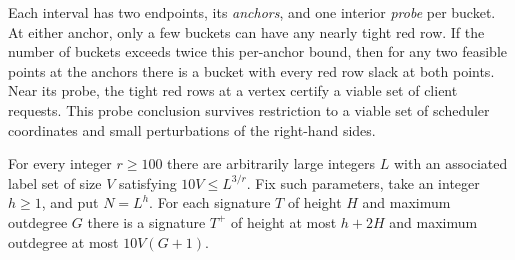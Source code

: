 Each interval has two endpoints, its \emph{anchors}, and one interior
\emph{probe} per bucket. At either anchor, only a few buckets can have any
nearly tight red row. If the number of buckets exceeds twice this
per-anchor bound, then for any two feasible points at the anchors there
is a bucket with every red row slack at both points. Near its probe, the
tight red rows at a vertex certify a viable set of client requests. This
probe conclusion survives restriction to a viable set of scheduler
coordinates and small perturbations of the right-hand sides.

\begin{theorem}[Scheduler]\label{thm:scheduler}
For every integer $r\geq100$ there are arbitrarily large integers $L$
with an associated label set of size $V$ satisfying $10V\leq L^{3/r}$.
Fix such parameters, take an integer $h\geq1$, and put $N=L^h$. For each signature
$T$ of height $H$ and maximum outdegree $G$ there is a signature $T^+$ of
height at most $h+2H$ and maximum outdegree at most $10V(G+1)$.


\end{theorem}
